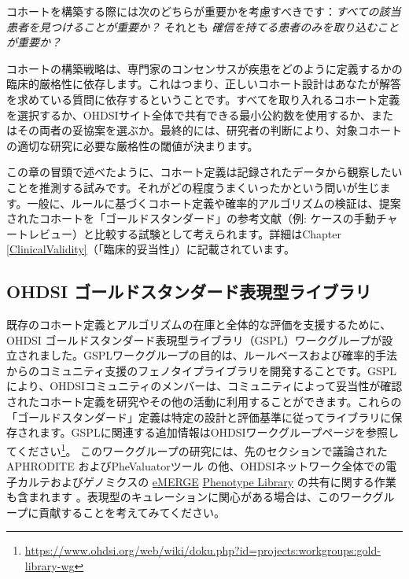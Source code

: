 \documentclass[
  11pt]{book}
\theoremstyle{definition}
\theoremstyle{definition}
\theoremstyle{definition}
\theoremstyle{definition}
\theoremstyle{remark}
\begin{document}
コホートを構築する際には次のどちらが重要かを考慮すべきです：\emph{すべての該当患者を見つけることが重要か？} それとも \emph{確信を持てる患者のみを取り込むことが重要か？}

コホートの構築戦略は、専門家のコンセンサスが疾患をどのように定義するかの臨床的厳格性に依存します。これはつまり、正しいコホート設計はあなたが解答を求めている質問に依存するということです。すべてを取り入れるコホート定義を選択するか、OHDSIサイト全体で共有できる最小公約数を使用するか、またはその両者の妥協案を選ぶか。最終的には、研究者の判断により、対象コホートの適切な研究に必要な厳格性の閾値が決まります。

この章の冒頭で述べたように、コホート定義は記録されたデータから観察したいことを推測する試みです。それがどの程度うまくいったかという問いが生じます。一般に、ルールに基づくコホート定義や確率的アルゴリズムの検証は、提案されたコホートを「ゴールドスタンダード」の参考文献（例: ケースの手動チャートレビュー）と比較する試験として考えられます。詳細はChapter \ref{ClinicalValidity}（「臨床的妥当性」）に記載されています。

\subsection{OHDSI ゴールドスタンダード表現型ライブラリ}\label{ohdsi-ux30b4ux30fcux30ebux30c9ux30b9ux30bfux30f3ux30c0ux30fcux30c9ux8868ux73feux578bux30e9ux30a4ux30d6ux30e9ux30ea}

既存のコホート定義とアルゴリズムの在庫と全体的な評価を支援するために、OHDSI ゴールドスタンダード表現型ライブラリ（GSPL）ワークグループが設立されました。GSPLワークグループの目的は、ルールベースおよび確率的手法からのコミュニティ支援のフェノタイプライブラリを開発することです。GSPLにより、OHDSIコミュニティのメンバーは、コミュニティによって妥当性が確認されたコホート定義を研究やその他の活動に利用することができます。これらの「ゴールドスタンダード」定義は特定の設計と評価基準に従ってライブラリに保存されます。GSPLに関連する追加情報はOHDSIワークグループページを参照してください\footnote{\url{https://www.ohdsi.org/web/wiki/doku.php?id=projects:workgroups:gold-library-wg}}。 このワークグループの研究には、先のセクションで議論されたAPHRODITE \citep{Banda2017APHRODITE} およびPheValuatorツール \citep{Swerdel2019phevaluator} の他、OHDSIネットワーク全体での電子カルテおよびゲノミクスの \href{https://emerge.mc.vanderbilt.edu/}{eMERGE} \href{https://phekb.org/phenotypes}{Phenotype Library} の共有に関する作業も含まれます \citep{Hripcsak2019eMERGE}。表現型のキュレーションに関心がある場合は、このワークグループに貢献することを考えてみてください。 
\end{document}
